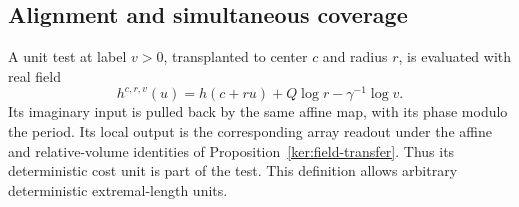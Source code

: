 \documentclass[11pt]{article}
\numberwithin{equation}{section}
\theoremstyle{definition}
\theoremstyle{remark}
\newcommand{\1}{\mathbf 1}
\begin{document}
\subsection{Alignment and simultaneous coverage}

A unit test at label \(v>0\), transplanted to center \(c\) and
radius \(r\), is evaluated with real field
\begin{equation}
 h^{c,r,v}(u)=h(c+ru)+Q\log r-\gamma^{-1}\log v.
 \label{ann:normalized-field}
\end{equation}
Its imaginary input is pulled back by the same affine map, with its
phase modulo the period.  Its local output is the corresponding
array readout under the affine and relative-volume identities of
Proposition~\ref{ker:field-transfer}.  Thus its deterministic cost
unit is part of the test.  This definition allows arbitrary
deterministic extremal-length units.
\end{document}
